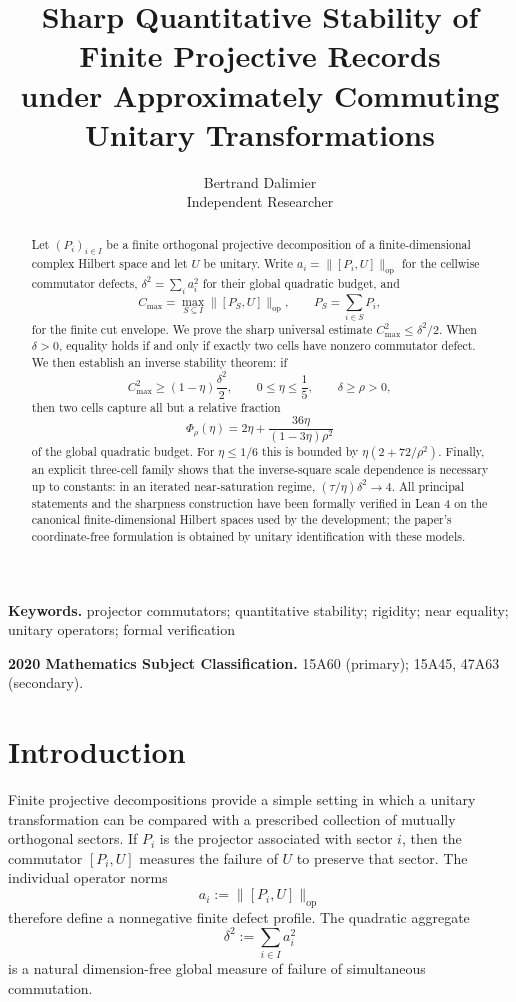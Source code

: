 \documentclass[11pt]{article}
\title{Sharp Quantitative Stability of Finite Projective Records\\
under Approximately Commuting Unitary Transformations}
\author{Bertrand Dalimier\\
Independent Researcher}
\date{}
\newcommand{\op}{\mathrm{op}}
\newcommand{\cmax}{C_{\max}}
\newcommand{\dd}{\delta}
\newcommand{\etaq}{\eta}
\newcommand{\tauq}{\tau}
\newcommand{\PhiRho}{\Phi_{\rho}}
\begin{document}
\maketitle

\begin{abstract}
Let $(P_i)_{i\in I}$ be a finite orthogonal projective decomposition of a
finite-dimensional complex Hilbert space and let $U$ be unitary.  Write
$a_i=\|[P_i,U]\|_{\op}$ for the cellwise commutator defects,
$\dd^2=\sum_i a_i^2$ for their global quadratic budget, and
\[
  \cmax=\max_{S\subseteq I}\|[P_S,U]\|_{\op},
  \qquad P_S=\sum_{i\in S}P_i ,
\]
for the finite cut envelope.  We prove the sharp universal estimate
$\cmax^2\le \dd^2/2$.  When $\dd>0$, equality holds if and only if exactly two
cells have nonzero commutator defect.  We then establish an inverse stability
theorem: if
\[
  \cmax^2\ge (1-\etaq)\frac{\dd^2}{2},\qquad
  0\le\etaq\le\frac15,\qquad \dd\ge\rho>0,
\]
then two cells capture all but a relative fraction
\[
  \PhiRho(\etaq)
  =2\etaq+\frac{36\etaq}{(1-3\etaq)\rho^2}
\]
of the global quadratic budget.  For $\etaq\le1/6$ this is bounded by
$\etaq(2+72/\rho^2)$.  Finally, an explicit three-cell family shows that the
inverse-square scale dependence is necessary up to constants: in an iterated
near-saturation regime, $(\tauq/\etaq)\dd^2\to4$.  All principal statements
and the sharpness construction have been formally verified in Lean 4 on the
canonical finite-dimensional Hilbert spaces used by the development; the
paper's coordinate-free formulation is obtained by unitary identification
with these models.
\end{abstract}

\noindent\textbf{Keywords.}
projector commutators; quantitative stability; rigidity; near equality;
unitary operators; formal verification

\noindent\textbf{2020 Mathematics Subject Classification.}
15A60 (primary); 15A45, 47A63 (secondary).

\section{Introduction}

Finite projective decompositions provide a simple setting in which a unitary
transformation can be compared with a prescribed collection of mutually
orthogonal sectors.  If $P_i$ is the projector associated with sector $i$,
then the commutator $[P_i,U]$ measures the failure of $U$ to preserve that
sector.  The individual operator norms
\[
  a_i:=\|[P_i,U]\|_{\op}
\]
therefore define a nonnegative finite defect profile.  The quadratic aggregate
\[
  \dd^2:=\sum_{i\in I} a_i^2
\]
is a natural dimension-free global measure of failure of simultaneous
commutation.
\end{document}
